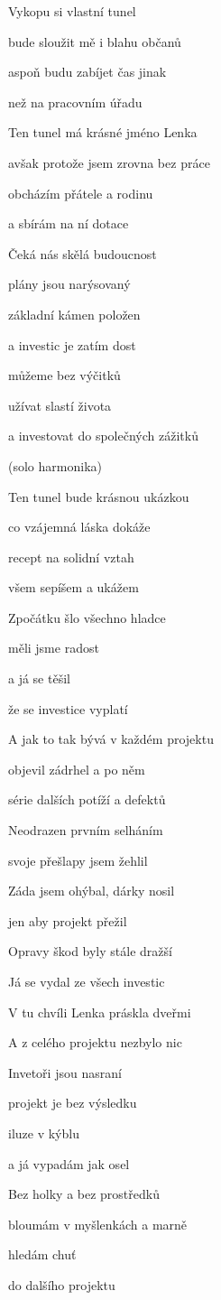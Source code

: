 

\zs
Vykopu si vlastní tunel

bude sloužit mě i blahu občanů

aspoň budu zabíjet čas jinak

než na pracovním úřadu
\ks

\zs
Ten tunel má krásné jméno Lenka

avšak protože jsem zrovna bez práce

obcházím přátele a rodinu

a sbírám na ní dotace
\ks

\zr
Čeká nás skělá budoucnost

plány jsou narýsovaný

základní kámen položen 

a investic je zatím dost

můžeme bez výčitků

užívat slastí života

a investovat do společných zážitků
\kr

\zs
(solo harmonika)
\ks

\zs
Ten tunel bude krásnou ukázkou

co vzájemná láska dokáže

recept na solidní vztah 

všem sepíšem a ukážem
\ks

\zr
Zpočátku šlo všechno hladce

měli jsme radost 

a já se těšil 

že se investice vyplatí


A jak to tak bývá v každém projektu

objevil zádrhel a po něm 

série dalších potíží a defektů
\kr

\zs
Neodrazen prvním selháním 

svoje přešlapy jsem žehlil

Záda jsem ohýbal, dárky nosil

jen aby projekt přežil
\ks

\zs
Opravy škod byly stále dražší

Já se vydal ze všech investic

V tu chvíli Lenka práskla dveřmi

A z celého projektu nezbylo nic
\ks

\zr
Invetoři jsou nasraní

projekt je bez výsledku

iluze v kýblu 

a já vypadám jak osel

Bez holky a bez prostředků

bloumám v myšlenkách a marně 

hledám chuť 

do dalšího projektu
\kr


\kp
